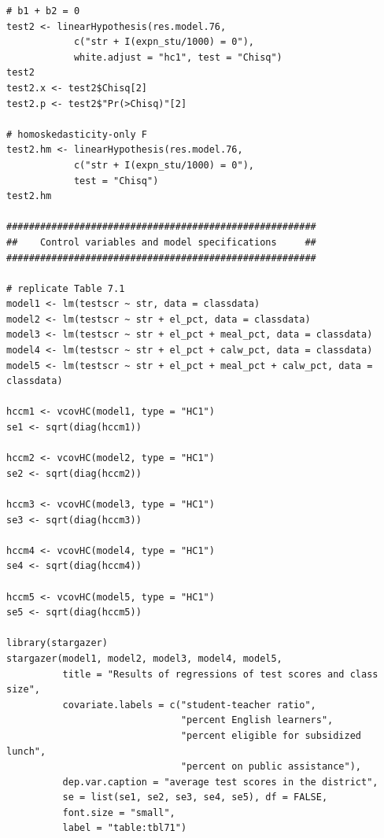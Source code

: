 \documentclass[a4paper,11pt]{article}
\begin{document}
\begin{verbatim}
# b1 + b2 = 0
test2 <- linearHypothesis(res.model.76,
            c("str + I(expn_stu/1000) = 0"),
            white.adjust = "hc1", test = "Chisq")
test2
test2.x <- test2$Chisq[2]
test2.p <- test2$"Pr(>Chisq)"[2]

# homoskedasticity-only F
test2.hm <- linearHypothesis(res.model.76,
            c("str + I(expn_stu/1000) = 0"),
            test = "Chisq")
test2.hm

#######################################################
##    Control variables and model specifications     ##
#######################################################

# replicate Table 7.1
model1 <- lm(testscr ~ str, data = classdata)
model2 <- lm(testscr ~ str + el_pct, data = classdata)
model3 <- lm(testscr ~ str + el_pct + meal_pct, data = classdata)
model4 <- lm(testscr ~ str + el_pct + calw_pct, data = classdata)
model5 <- lm(testscr ~ str + el_pct + meal_pct + calw_pct, data = classdata)

hccm1 <- vcovHC(model1, type = "HC1")
se1 <- sqrt(diag(hccm1))

hccm2 <- vcovHC(model2, type = "HC1")
se2 <- sqrt(diag(hccm2))

hccm3 <- vcovHC(model3, type = "HC1")
se3 <- sqrt(diag(hccm3))

hccm4 <- vcovHC(model4, type = "HC1")
se4 <- sqrt(diag(hccm4))

hccm5 <- vcovHC(model5, type = "HC1")
se5 <- sqrt(diag(hccm5))

library(stargazer)
stargazer(model1, model2, model3, model4, model5,
          title = "Results of regressions of test scores and class size",
          covariate.labels = c("student-teacher ratio",
                               "percent English learners",
                               "percent eligible for subsidized lunch",
                               "percent on public assistance"),
          dep.var.caption = "average test scores in the district",
          se = list(se1, se2, se3, se4, se5), df = FALSE,
          font.size = "small",
          label = "table:tbl71")
\end{verbatim}
\end{document}
